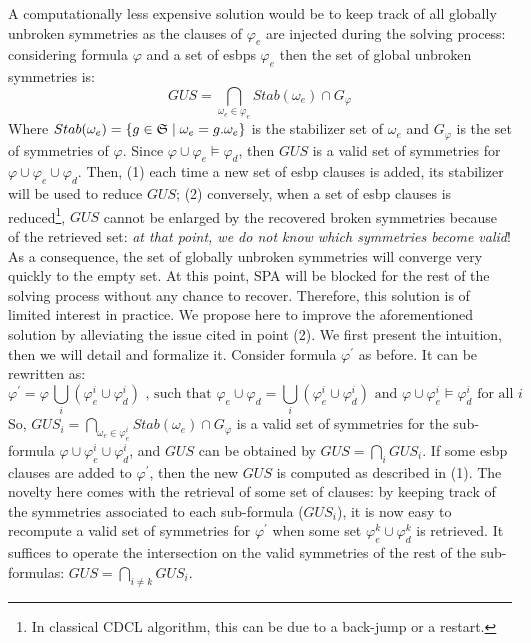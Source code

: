 A  computationally less expensive solution would be to keep track of all globally unbroken symmetries as the clauses of $\varphi_e$ are injected during the solving process: considering formula $\varphi$ and 
a set of esbps $\varphi_e$ then the set of global unbroken symmetries is:
$$GUS = \underset{\omega_e \in \varphi_e}{\bigcap}Stab(\omega_e) \cap G_{\varphi}$$
 Where  $Stab(\omega_e)=\{g \in \mathfrak{S} \mid
\omega_e=g.\omega_e\}$ is the stabilizer set of $\omega_e$ and $G_{\varphi}$ is the set of symmetries of $\varphi$. 
Since $\varphi \cup \varphi_e  \models \varphi_d$, then $GUS$ is a valid set of symmetries for $\varphi \cup \varphi_e \cup \varphi_d$.
Then, (1) each time a new set of esbp clauses is added, its stabilizer will be used to reduce $GUS$;\label{prop:one}
(2) conversely, when a set of esbp clauses is reduced\footnote{In classical CDCL algorithm, this can be due to a back-jump or a restart.},
$GUS$ cannot be enlarged by the recovered broken symmetries because of the retrieved set:
\textit{at that point, we do not know which symmetries become valid}! 
As a consequence, the set of globally unbroken symmetries will converge very quickly to the empty set. 
At this point, SPA will be blocked for the rest of the solving process without any chance to recover.
 Therefore, this solution is of limited interest in practice.
We propose here to improve the aforementioned solution by alleviating the issue cited in point (2).
We first present the intuition, then we will detail and formalize it. 
Consider formula $\varphi^\prime$ as before. It can be rewritten as:
$$\varphi^\prime=\varphi \, \underset{i}{\bigcup}(\varphi_e^i \cup \varphi_d^i) \text{ , such that } \varphi_e \cup \varphi_d = \underset{i}{\bigcup}(\varphi_e^i \cup \varphi_d^i) \text{ and } \varphi \cup \varphi_e^i \models \varphi_d^i  \text{ for all } i$$
So, $GUS_i = \underset{\omega_e \in \varphi_e^i}{\bigcap}Stab(\omega_e) \cap G_{\varphi}$ is a valid set of symmetries for the sub-formula $\varphi \cup \varphi_e^i \cup \varphi_d^i$, and $GUS$ can be obtained by $GUS = \underset{i}{\bigcap} GUS_i$. If some esbp clauses are added to $\varphi^\prime$, then the new $GUS$ is computed as described in (1). The novelty here comes with the retrieval of some set of clauses: by keeping track of the symmetries associated to each sub-formula ($GUS_i$), it is now easy to recompute a valid set of symmetries for $\varphi^\prime$ when some set
$\varphi_e^k \cup \varphi_d^k$ is retrieved. It suffices to operate the intersection on the valid symmetries of the rest of the sub-formulas: $GUS = \underset{i \neq k}{\bigcap} GUS_i$.

